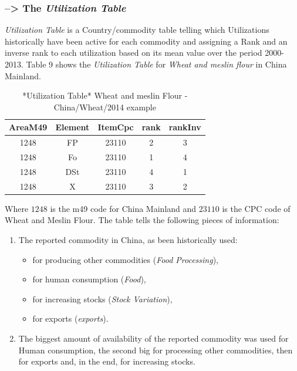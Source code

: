 \documentclass[]{article}
\providecommand{\tightlist}{%
  \setlength{\itemsep}{0pt}\setlength{\parskip}{0pt}}
\begin{document}
\subsubsection*{\texorpdfstring{--\textgreater{} The \emph{Utilization
Table}}{--\textgreater{} The Utilization Table}}\label{the-utilization-table}

\emph{Utilization Table} is a Country/commodity table telling which
Utilizations historically have been active for each commodity and
assigning a Rank and an inverse rank to each utilization based on its
mean value over the period 2000-2013. Table 9 shows the
\emph{Utilization Table} for \emph{Wheat and meslin flour} in China
Mainland.

\begin{table}

\caption{\label{tab:t8}*Utilization Table* Wheat and meslin Flour - China/Wheat/2014 example}
\centering
\begin{tabular}[t]{c|c|c|c|c}
\hline
AreaM49 & Element & ItemCpc & rank & rankInv\\
\hline
1248 & FP & 23110 & 2 & 3\\
\hline
1248 & Fo & 23110 & 1 & 4\\
\hline
1248 & DSt & 23110 & 4 & 1\\
\hline
1248 & X & 23110 & 3 & 2\\
\hline
\end{tabular}
\end{table}

Where \(1248\) is the m49 code for China Mainland and \(23110\) is the
CPC code of Wheat and Meslin Flour. The table tells the following pieces
of information:

\begin{enumerate}
\def\labelenumi{\arabic{enumi}.}
\tightlist
\item
  The reported commodity in China, as been historically used:

  \begin{itemize}
  \tightlist
  \item
    for producing other commodities (\emph{Food Processing}),
  \item
    for human consumption (\emph{Food}),
  \item
    for increasing stocks (\emph{Stock Variation}),
  \item
    for exports (\emph{exports}).
  \end{itemize}
\item
  The biggest amount of availability of the reported commodity was used
  for Human consumption, the second big for processing other
  commodities, then for exports and, in the end, for increasing stocks.
\end{enumerate}
\end{document}
